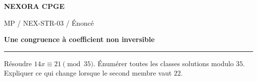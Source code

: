 \documentclass[11pt,a4paper]{article}
\begin{document}
{\small\bfseries\color{nexorablue} NEXORA CPGE}\par
{\small MP / NEX-STR-03 / Énoncé}\par
{\LARGE\bfseries Une congruence à coefficient non inversible}\par
\vspace{0.25em}\hrule\vspace{0.6em}

Résoudre $14x\equiv21\pmod{35}$. Énumérer toutes les classes solutions modulo $35$. Expliquer ce qui change lorsque le second membre vaut $22$.
\end{document}
